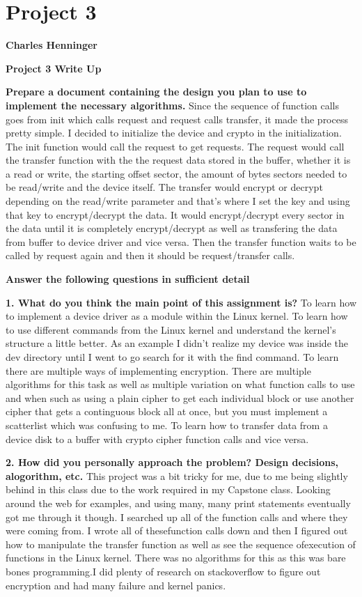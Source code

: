 \documentclass[draftclsnofoot,onecolumn,letterpaper,10pt,titlepage]{IEEEtran}
\begin{document}
\section*{Project 3}

\textbf{Charles Henninger}

\textbf{Project 3 Write Up}

\textbf{Prepare a document containing the design you plan to use to implement the necessary algorithms.}
	Since the sequence of function calls goes from init which calls request and request calls transfer, it made the process pretty simple. I decided to initialize the device and crypto in the initialization. The init function would call the request to get requests. The request would call the transfer function with the the request data stored in the buffer, whether it is a read or write, the starting offset sector, the amount of bytes sectors needed to be read/write and the device itself. The transfer would encrypt or decrypt depending on the read/write parameter and that's where I set the key and using that key to encrypt/decrypt the data. It would encrypt/decrypt every sector in the data until it is completely encrypt/decrypt as well as transfering the data from buffer to device driver and vice versa. Then the transfer function waits to be called by request again and then it should be request/transfer calls.

\textbf{Answer the following questions in sufficient detail}

    \textbf{1. What do you think the main point of this assignment is?}
     To learn how to implement a device driver as a module within the Linux kernel. To learn how to use different commands from the Linux kernel and understand the kernel's structure a little better. As an example I didn't realize my device was inside the dev directory until I went to go search for it with the find command. To learn there are multiple ways of implementing encryption. There are multiple algorithms for this task as well as multiple variation on what function calls to use and when such as using a plain cipher to get each individual block or use another cipher that gets a continguous block all at once, but you must implement a scatterlist which was confusing to me. To learn how to transfer data from a device disk to a buffer with crypto cipher function calls and vice versa.

    \textbf{2. How did you personally approach the problem? Design decisions, alogorithm, etc.}
	This project was a bit tricky for me, due to me being slightly behind in this class due to the work required in my Capstone class. Looking around the web for examples, and using many, many print statements eventually got me through it though.  I  searched  up  all  of  the  function  calls  and  where  they  were  coming  from.  I  wrote  all  of  thesefunction calls down and then I figured out how to manipulate the transfer function as well as see the sequence ofexecution of functions in the Linux kernel. There was no algorithms for this as this was bare bones programming.I did plenty of research on stackoverflow to figure out encryption and had many failure and kernel panics. 
    
\end{document}
